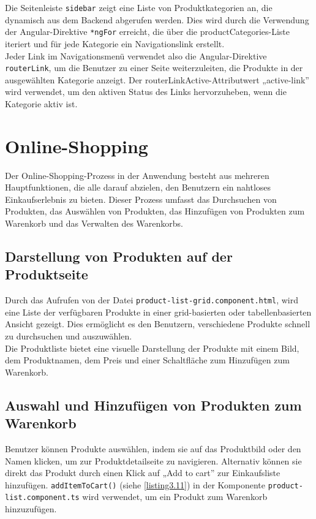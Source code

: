 Die Seitenleiste \verb*|sidebar| zeigt eine Liste von Produktkategorien an, die dynamisch aus dem Backend abgerufen werden. Dies wird durch die Verwendung der Angular-Direktive \verb*|*ngFor| erreicht, die über die productCategories-Liste iteriert und für jede Kategorie ein Navigationslink erstellt.\\
Jeder Link im Navigationsmenü verwendet also die Angular-Direktive \verb*|routerLink|, um die Benutzer zu einer Seite weiterzuleiten, die Produkte in der ausgewählten Kategorie anzeigt. Der routerLinkActive-Attributwert „active-link'' wird verwendet, um den aktiven Status des Links hervorzuheben, wenn die Kategorie aktiv ist.


\section{Online-Shopping}

Der Online-Shopping-Prozess in der Anwendung besteht aus mehreren Hauptfunktionen, die alle darauf abzielen, den Benutzern ein nahtloses Einkaufserlebnis zu bieten. Dieser Prozess umfasst das Durchsuchen von Produkten, das Auswählen von Produkten, das Hinzufügen von Produkten zum Warenkorb und das Verwalten des Warenkorbs.

\subsection{Darstellung von Produkten auf der Produktseite}

Durch das Aufrufen von der Datei \verb*|product-list-grid.component.html|, wird eine Liste der verfügbaren Produkte in einer grid-basierten oder tabellenbasierten Ansicht gezeigt. Dies ermöglicht es den Benutzern, verschiedene Produkte schnell zu durchsuchen und auszuwählen. \\
Die Produktliste bietet eine visuelle Darstellung der Produkte mit einem Bild, dem Produktnamen, dem Preis und einer Schaltfläche zum Hinzufügen zum Warenkorb.

\subsection{Auswahl und Hinzufügen von Produkten zum Warenkorb}

Benutzer können Produkte auswählen, indem sie auf das Produktbild oder den Namen klicken, um zur Produktdetailseite zu navigieren. Alternativ können sie direkt das Produkt durch einen Klick auf „Add to cart'' zur Einkaufsliste hinzufügen. \verb*|addItemToCart()| (siehe \ref{listing3.11}) in der Komponente \verb*|product-list.component.ts| wird verwendet, um ein Produkt zum Warenkorb hinzuzufügen.

